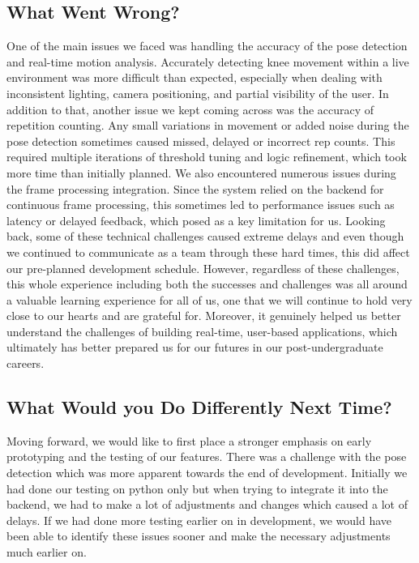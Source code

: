 \documentclass{article}
\begin{document}
\subsection{What Went Wrong?}

One of the main issues we faced was handling the accuracy of the pose detection and real-time 
motion analysis. Accurately detecting knee movement within a live environment was more difficult 
than expected, especially when dealing with inconsistent lighting, camera positioning, and partial 
visibility of the user. In addition to that, another issue we kept coming across was the accuracy 
of repetition counting. Any small variations in movement or added noise during the pose detection 
sometimes caused missed, delayed or incorrect rep counts. This required multiple iterations of 
threshold tuning and logic refinement, which took more time than initially planned. We also encountered 
numerous issues during the frame processing integration. Since the system relied on the backend 
for continuous frame processing, this sometimes led to performance issues such as latency or 
delayed feedback, which posed as a key limitation for us. Looking back, some of these technical 
challenges caused extreme delays and even though we continued to communicate as a team through
these hard times, this did affect our pre-planned development schedule. However, regardless of 
these challenges, this whole experience including both the successes and challenges was all around 
a valuable learning experience for all of us, one that we will continue to hold very close to our 
hearts and are grateful for. Moreover, it genuinely helped us better understand the challenges of
building real-time, user-based applications, which ultimately has better prepared us for our futures 
in our post-undergraduate careers.

\subsection{What Would you Do Differently Next Time?}

Moving forward, we would like to first place a stronger emphasis on early prototyping and the testing of our features. There was a challenge with the pose detection which was more apparent towards the end of development. Initially we had done our testing on python only but when trying to integrate it into the backend, we had to make a lot of adjustments and changes which caused a lot of delays. If we had done more testing earlier on in development, we would have been able to identify these issues sooner and make the necessary adjustments much earlier on. 
\end{document}
